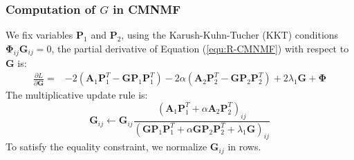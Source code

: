 \documentclass{bmcart}
\begin{document}
\subsubsection*{\textbf{Computation of $G$ in CMNMF}}
We fix variables $\bm{P}_1$ and $\bm{P}_2$,
using the Karush-Kuhn-Tucher (KKT) conditions $\bm{\Phi}_{ij}\bm{G}_{ij}=0$, the partial derivative of Equation (\ref{equ:R-CMNMF}) with respect to $\bm{G}$ is:
\begin{equation}\label{equ:G_gradient}\nonumber
\begin{split}
\frac{\partial{L}}{\partial{\bm{G}}}=
&-2(\bm{A}_1{\bm{P}_1^T} - \bm{G}{\bm{P}_1}{\bm{P}_1^T})-2\alpha(\bm{A}_2{\bm{P}_2^T} - \bm{G}{\bm{P}_2}{\bm{P}_2^T})+2\lambda_1\bm{G}+\bm{\Phi}
\end{split}
\end{equation}
The multiplicative update rule is:
\begin{equation}\label{equ:updating_G}\nonumber
\bm{G}_{ij}\leftarrow \bm{G}_{ij}
\frac{(\bm{A}_1\bm{P}_1^T+\alpha \bm{A}_2\bm{P}_2^T)_{ij}}
{(\bm{GP}_1\bm{P}_1^T+\alpha \bm{GP}_2\bm{P}_2^T+\lambda_1\bm{G})_{ij}}
\end{equation}
To satisfy the equality constraint, we normalize $\bm{G}_{ij}$ in rows.

\end{document}
